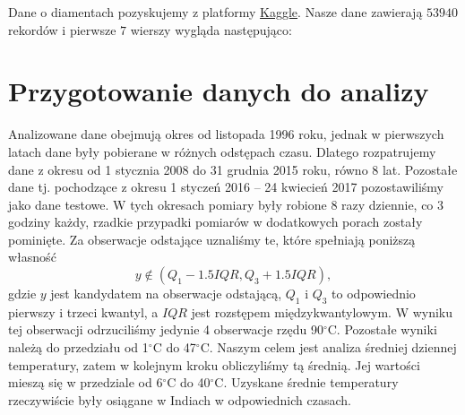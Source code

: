 \documentclass[12pt]{article}
\theoremstyle{exer}
\begin{document}
	Dane o diamentach pozyskujemy z platformy \href{https://www.kaggle.com}{Kaggle}. Nasze dane zawierają $53940$ rekordów i pierwsze $7$ wierszy wygląda następująco:
	\begin{table}[H]
		\caption{Oryginalne dane.}
		\label{orginalne_dane}
	\end{table}
	

	\section{Przygotowanie danych do analizy}
	Analizowane dane obejmują okres od listopada 1996 roku, jednak w pierwszych latach dane były pobierane w różnych odstępach czasu. Dlatego rozpatrujemy dane z okresu od 1 stycznia 2008 do 31 grudnia 2015 roku, równo 8 lat. Pozostałe dane tj. pochodzące z okresu 1 styczeń 2016 -- 24 kwiecień 2017 pozostawiliśmy jako dane testowe. W tych okresach pomiary były robione 8 razy dziennie, co 3 godziny każdy, rzadkie przypadki pomiarów w dodatkowych porach zostały pominięte. Za obserwacje odstające uznaliśmy te, które spełniają poniższą własność
	\begin{equation}
		y\notin\left(Q_1-1.5IQR,Q_3+1.5IQR\right),
	\end{equation}
	gdzie $y$ jest kandydatem na obserwacje odstającą, $Q_1$ i $Q_3$ to odpowiednio pierwszy i trzeci kwantyl, a $IQR$ jest rozstępem międzykwantylowym. W wyniku tej obserwacji odrzuciliśmy jedynie 4 obserwacje rzędu 90$^\circ$C. Pozostałe wyniki należą do przedziału od 1$^\circ$C do 47$^\circ$C. Naszym celem jest analiza średniej dziennej temperatury, zatem w kolejnym kroku obliczyliśmy tą średnią. Jej wartości mieszą się w przedziale od 6$^\circ$C do 40$^\circ$C. Uzyskane średnie temperatury rzeczywiście były osiągane w Indiach w odpowiednich czasach.
	
\end{document}
